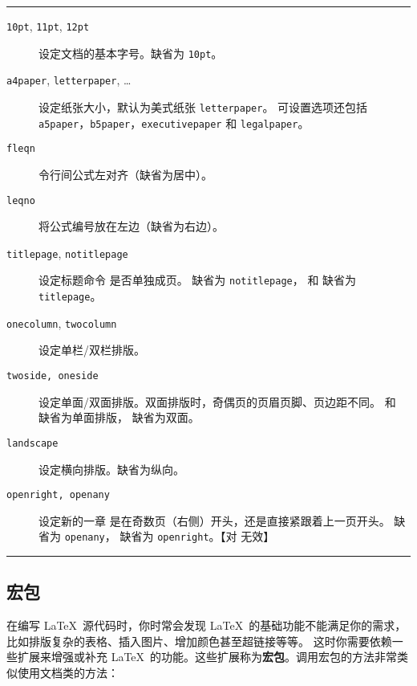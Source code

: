 \begin{table}[!hbp]
\caption{\LaTeX\ 标准的三个文档类可设定的选项}\label{tbl:ltx-options}
\hrule
\begin{flushleft}
\begin{description}
\item[\texttt{10pt}, \texttt{11pt}, \texttt{12pt}] \quad 设定文档的基本字号。缺省为 \texttt{10pt}。

\item[\texttt{a4paper}, \texttt{letterpaper}, \ldots] \quad 设定纸张大小，默认为美式纸张 \texttt{letterpaper}。
可设置选项还包括 \texttt{a5paper}，\texttt{b5paper}，\texttt{executivepaper} 和 \texttt{legalpaper}。

\item[\texttt{fleqn}] \quad 令行间公式左对齐（缺省为居中）。

\item[\texttt{leqno}] \quad 将公式编号放在左边（缺省为右边）。

\item[\texttt{titlepage}, \texttt{notitlepage}] 设定标题命令  是否单独成页。
 缺省为 \texttt{notitlepage}， 和  缺省为 \texttt{titlepage}。

\item[\texttt{onecolumn}, \texttt{twocolumn}] \quad 设定单栏/双栏排版。

\item[\texttt{twoside, oneside}] \quad 设定单面/双面排版。双面排版时，奇偶页的页眉页脚、页边距不同。
 和  缺省为单面排版， 缺省为双面。

\item[\texttt{landscape}] \quad 设定横向排版。缺省为纵向。

\item[\texttt{openright, openany}] \quad 设定新的一章  是在奇数页（右侧）开头，还是直接紧跟着上一页开头。
 缺省为 \texttt{openany}， 缺省为 \texttt{openright}。【对  无效】
\end{description}
\end{flushleft}
\hrule
\end{table}

\subsection{宏包}\label{subsec:packages}

在编写 \LaTeX\ 源代码时，你时常会发现 \LaTeX\ 的基础功能不能满足你的需求，比如排版复杂的表格、插入图片、增加颜色甚至超链接等等。
这时你需要依赖一些扩展来增强或补充 \LaTeX\ 的功能。这些扩展称为\textbf{宏包}。调用宏包的方法非常类似使用文档类的方法：
\begin{command}
\end{command}

